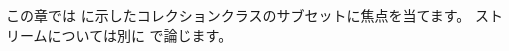 \documentclass[a4paper,10pt,twoside]{book}
\begin{document}



この章では  に示したコレクションクラスのサブセットに焦点を当てます。
ストリームについては別に  で論じます。


\end{document}
